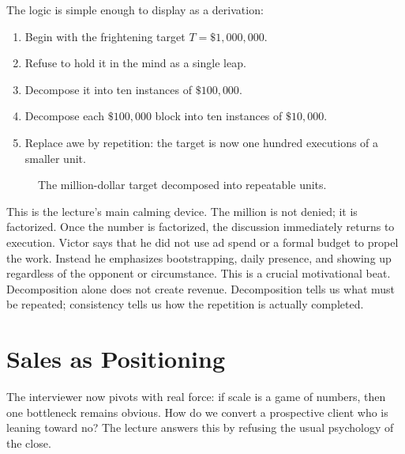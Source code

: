The logic is simple enough to display as a derivation:
\begin{enumerate}
\item Begin with the frightening target \(T = \$1{,}000{,}000\).
\item Refuse to hold it in the mind as a single leap.
\item Decompose it into ten instances of \(\$100{,}000\).
\item Decompose each \(\$100{,}000\) block into ten instances of \(\$10{,}000\).
\item Replace awe by repetition: the target is now one hundred executions of a smaller unit.
\end{enumerate}

\begin{figure}
\centering
{}
\caption{The million-dollar target decomposed into repeatable units.}
\end{figure}

This is the lecture's main calming device. The million is not denied; it is factorized. Once the number is factorized, the discussion immediately returns to execution. Victor says that he did not use ad spend or a formal budget to propel the work. Instead he emphasizes bootstrapping, daily presence, and showing up regardless of the opponent or circumstance. This is a crucial motivational beat. Decomposition alone does not create revenue. Decomposition tells us what must be repeated; consistency tells us how the repetition is actually completed.

\section{Sales as Positioning}

The interviewer now pivots with real force: if scale is a game of numbers, then one bottleneck remains obvious. How do we convert a prospective client who is leaning toward no? The lecture answers this by refusing the usual psychology of the close.

